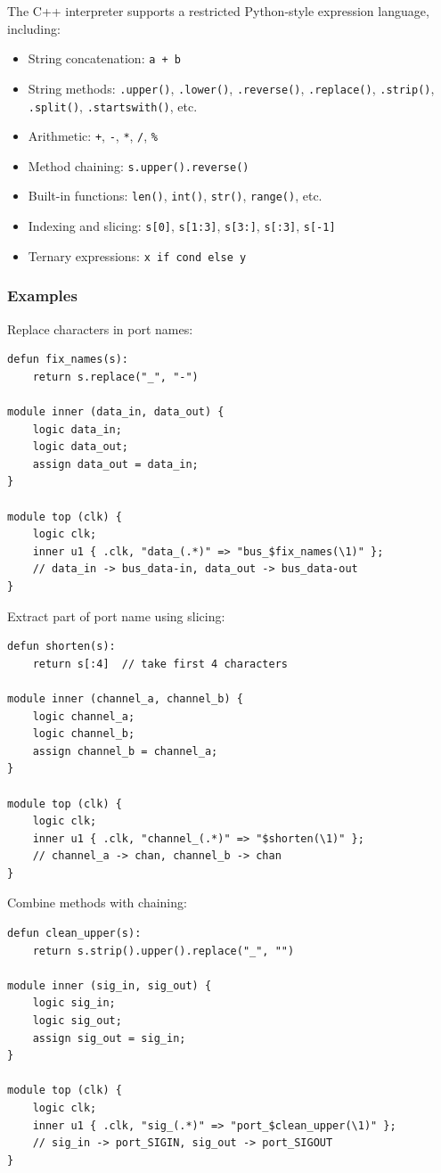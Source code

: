 \documentclass[lang=en,11pt]{elegantbook}
\newcommand{\code}[1]{\texttt{#1}}
\begin{document}
The C++ interpreter supports a restricted Python-style expression language, including:
\begin{itemize}
  \item String concatenation: \code{a + b}
  \item String methods: \code{.upper()}, \code{.lower()}, \code{.reverse()}, \code{.replace()}, \code{.strip()}, \code{.split()}, \code{.startswith()}, etc.
  \item Arithmetic: \code{+}, \code{-}, \code{*}, \code{/}, \code{\%}
  \item Method chaining: \code{s.upper().reverse()}
  \item Built-in functions: \code{len()}, \code{int()}, \code{str()}, \code{range()}, etc.
  \item Indexing and slicing: \code{s[0]}, \code{s[1:3]}, \code{s[3:]}, \code{s[:3]}, \code{s[-1]}
  \item Ternary expressions: \code{x if cond else y}
\end{itemize}

\subsubsection{Examples}

Replace characters in port names:
\begin{lstlisting}[language=Slip]
defun fix_names(s):
    return s.replace("_", "-")

module inner (data_in, data_out) {
    logic data_in;
    logic data_out;
    assign data_out = data_in;
}

module top (clk) {
    logic clk;
    inner u1 { .clk, "data_(.*)" => "bus_$fix_names(\1)" };
    // data_in -> bus_data-in, data_out -> bus_data-out
}
\end{lstlisting}

Extract part of port name using slicing:
\begin{lstlisting}[language=Slip]
defun shorten(s):
    return s[:4]  // take first 4 characters

module inner (channel_a, channel_b) {
    logic channel_a;
    logic channel_b;
    assign channel_b = channel_a;
}

module top (clk) {
    logic clk;
    inner u1 { .clk, "channel_(.*)" => "$shorten(\1)" };
    // channel_a -> chan, channel_b -> chan
}
\end{lstlisting}

Combine methods with chaining:
\begin{lstlisting}[language=Slip]
defun clean_upper(s):
    return s.strip().upper().replace("_", "")

module inner (sig_in, sig_out) {
    logic sig_in;
    logic sig_out;
    assign sig_out = sig_in;
}

module top (clk) {
    logic clk;
    inner u1 { .clk, "sig_(.*)" => "port_$clean_upper(\1)" };
    // sig_in -> port_SIGIN, sig_out -> port_SIGOUT
}
\end{lstlisting}
\end{document}
